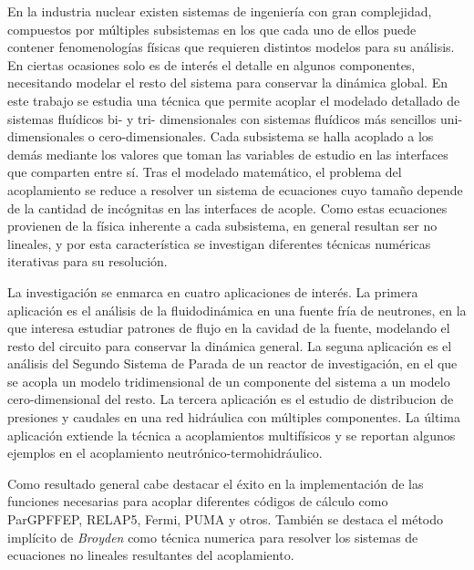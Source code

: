 \begin{resumen}
En la industria nuclear existen sistemas de ingeniería con gran complejidad, compuestos por múltiples subsistemas en los que cada uno de ellos puede contener fenomenologías físicas que requieren distintos modelos para su análisis.
En ciertas ocasiones solo es de interés el detalle en algunos componentes,
necesitando modelar el resto del sistema para conservar la dinámica global.
En este trabajo se estudia una técnica que permite acoplar el modelado detallado de sistemas fluídicos bi- y tri- dimensionales 
con sistemas fluídicos más sencillos uni-dimensionales o cero-dimensionales. 
Cada subsistema se halla acoplado a los demás mediante los valores que toman las variables de estudio en las interfaces que comparten entre sí.
Tras el modelado matemático, el problema del acoplamiento se reduce a resolver un sistema de ecuaciones cuyo tamaño depende de la cantidad de incógnitas en las interfaces de acople.
Como estas ecuaciones provienen de la física inherente a cada subsistema, en general resultan ser no lineales, y por esta característica se investigan diferentes técnicas numéricas iterativas para su resolución.

La investigación se enmarca en cuatro aplicaciones de interés. La primera aplicación es el análisis de la fluidodinámica en una fuente fría de neutrones, en la que interesa estudiar patrones de flujo en la cavidad de la fuente, modelando el resto del circuito para conservar la dinámica general. La seguna aplicación es el análisis del Segundo Sistema de Parada de un reactor de investigación, en el que se acopla un modelo tridimensional de un componente del sistema a un modelo cero-dimensional del resto. La tercera aplicación es el estudio de distribucion de presiones y caudales en una red hidráulica con múltiples componentes. La última aplicación extiende la técnica a acoplamientos multifísicos y se reportan algunos ejemplos en el acoplamiento neutrónico-termohidráulico. 

Como resultado general cabe destacar el éxito en la implementación de las funciones necesarias para acoplar diferentes códigos de cálculo como ParGPFFEP, RELAP5, Fermi, PUMA y otros. También se destaca el método implícito de \textit{Broyden} como técnica numerica para resolver los sistemas de ecuaciones no lineales resultantes del acoplamiento.
\end{resumen}

